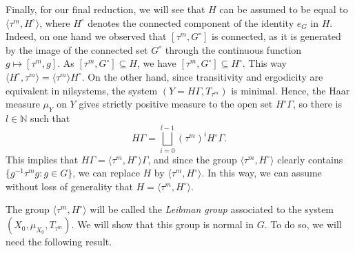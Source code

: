\documentclass[letter, 11pt]{article}
\theoremstyle{definition}
\theoremstyle{plain}
\newcommand{\N}{\mathbb{N}}
\newcommand{\1}{\mathbbm{1}}
\begin{document}
Finally, for our final reduction, we will see that $H$ can be assumed to be equal to $\langle \tau^m, H^\circ\rangle$, where $H^{\circ}$ denotes the connected component of the identity $e_G$ in $H$. Indeed, on one hand we observed that $[\tau^m,G^\circ]$ is connected, as it is generated by the image of the connected set $G^\circ$ through the continuous function $g\mapsto [\tau^m,g]$. As $[\tau^m,G^\circ]\subseteq H$, we have $[\tau^m,G^\circ]\subseteq H^\circ$. This way $\langle H^\circ,\tau^m\rangle= \langle \tau^m \rangle H^\circ$. On the other hand, since transitivity and ergodicity are equivalent in nilsystems, the system $(Y=H\Gamma,T_{\tau^m})$ is minimal. Hence, the Haar measure $\mu_Y$ on $Y$ gives strictly positive measure to the open set $ H^{\circ}\Gamma$, so there is $l\in \N$ such that
$$ H\Gamma =\bigsqcup_{i=0}^{l-1} (\tau^m)^i H^{\circ}\Gamma.$$
This implies that $H\Gamma=\langle \tau^m,H^\circ\rangle \Gamma $, and since the group $\langle \tau^m,H^\circ\rangle$ clearly contains $ \{g^{-1}\tau^{m}g: g\in G\}$, we can replace $H$ by $\langle \tau^m,H^\circ\rangle$. In this way, we can assume without loss of generality that $H=\langle \tau^m, H^{\circ}\rangle$.

The group $\langle {\tau^m}, H^{\circ}\rangle$ will be called the \textit{Leibman group} associated to the system $(X_0,\mu_{X_0},T_{\tau^m})$. We will show that this group is normal in $G$. To do so, we will need the following result.
\end{document}
